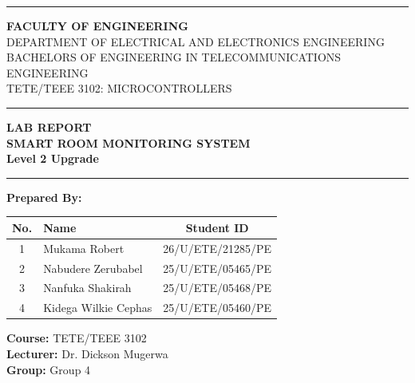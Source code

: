 \documentclass[12pt,a4paper]{article}
\begin{document}

\begin{titlepage}
    \centering
    
    \rule{3cm}{3cm} %
    \vspace{1cm}
    
    {\Large \textbf{FACULTY OF ENGINEERING}}\\[0.2cm]
    {\large DEPARTMENT OF ELECTRICAL AND ELECTRONICS ENGINEERING}\\[0.2cm]
    {\large BACHELORS OF ENGINEERING IN TELECOMMUNICATIONS ENGINEERING}\\[0.5cm]
    
    {\large TETE/TEEE 3102: MICROCONTROLLERS}\\[1cm]
    
    \hrule
    \vspace{0.5cm}
    {\huge \textbf{LAB REPORT}}\\[0.3cm]
    {\LARGE \textbf{SMART ROOM MONITORING SYSTEM}}\\[0.2cm]
    {\Large \textbf{Level 2 Upgrade}}
    \vspace{0.5cm}
    \hrule
    \vspace{1.5cm}
    
    {\Large \textbf{Prepared By:}}
    \vspace{0.5cm}
    
    \begin{center}
        \renewcommand{\arraystretch}{1.2}
        \begin{tabular}{|c|l|c|}
            \hline
            \textbf{No.} & \textbf{Name} & \textbf{Student ID} \\
            \hline
            1 & Mukama Robert & 26/U/ETE/21285/PE \\
            2 & Nabudere Zerubabel & 25/U/ETE/05465/PE \\
            3 & Nanfuka Shakirah & 25/U/ETE/05468/PE \\
            4 & Kidega Wilkie Cephas & 25/U/ETE/05460/PE \\
            \hline
        \end{tabular}
    \end{center}
    
    \vfill
    
    \begin{flushleft}
        \textbf{Course:} TETE/TEEE 3102 \\
        \textbf{Lecturer:} Dr. Dickson Mugerwa \\
        \textbf{Group:} Group 4
    \end{flushleft}
    

\end{titlepage}
\end{document}
